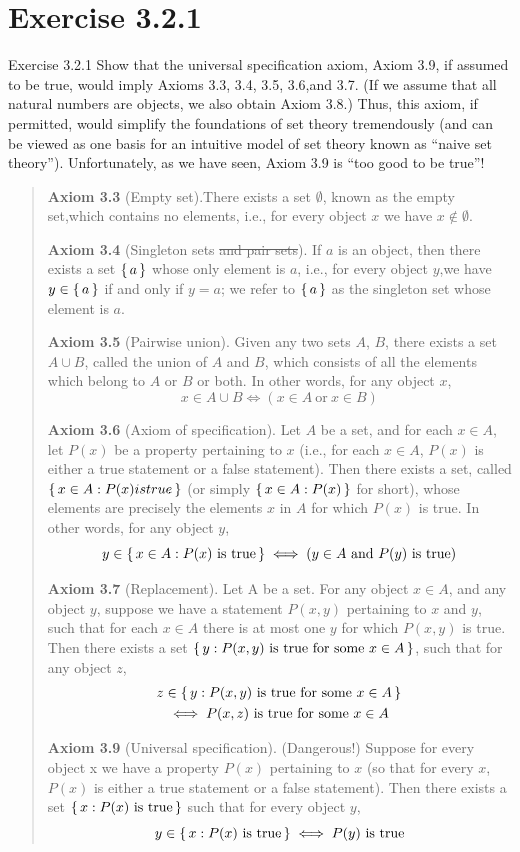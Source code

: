 \documentclass{article}
\begin{document}
\section{Exercise 3.2.1}
Exercise 3.2.1 Show that the universal specification axiom, Axiom 3.9, if assumed to be true,
would imply Axioms 3.3, 3.4, 3.5, 3.6,and 3.7. (If we assume that all natural numbers are objects,
we also obtain Axiom 3.8.) Thus, this axiom, if permitted, would simplify the foundations of set
theory tremendously (and can be viewed as one basis for an intuitive model of set theory known as
“naive set theory”). Unfortunately, as we have seen, Axiom 3.9 is “too good to be true”!
\begin{quotation}
    \textbf{Axiom 3.3} (Empty set).There exists a set $\emptyset$, known as the empty set,which contains
    no elements, i.e., for every object $x$ we have $x \notin \emptyset$.

    \textbf{Axiom 3.4} (Singleton sets \st{and pair sets}). If $a$ is an object, then there exists a set
    $\set{a}$ whose only element is $a$, i.e., for every object $y$,we have $y \in\set{a}$ if and only if
    $y =a$; we refer to $\set{a}$ as the singleton set whose element is $a$.

    \textbf{Axiom 3.5} (Pairwise union). Given any two sets $A$, $B$, there exists a set $A \cup B$,
    called the union of $A$ and $B$, which consists of all the elements which belong to $A$
    or $B$ or both. In other words, for any object $x$,
    \[x \in A\cup B \iff (x \in A\ \text{or}\ x \in B)\]

    \textbf{Axiom 3.6} (Axiom of specification). Let $A$ be a set, and for each $x \in  A$, let $P(x)$
    be a property pertaining to $x$ (i.e., for each $x \in  A$, $P(x)$ is either a true statement or
    a false statement). Then there exists a set, called $\set{x \in  A : P(x) is true}$ (or simply
    $\set{x \in  A : P(x)}$ for short), whose elements are precisely the elements $x$ in $A$ for
    which $P(x)$ is true. In other words, for any object $y$,
    \[y \in
        \set{x \in  A: P(x)\ \text{is true}}
        \iff(y \in  A\ \text{and}\ P(y)\ \text{is true})\]

    \textbf{Axiom 3.7} (Replacement). Let A be a set. For any object $x\in A$, and any object
    $y$, suppose we have a statement $P(x, y)$ pertaining to $x$ and $y$, such that for each
    $x\in A$ there is at most one $y$ for which $P(x,y)$ is true. Then there exists a set
    $\set{y : P(x, y)\text{ is true for some } x\in A}$, such that for any object $z$,
    \begin{gather*}
        z \in\set{y : P(x, y)\text{ is true for some }x\in A}\\
        \iff P(x,z)\text{ is true for some }x\in A
    \end{gather*}

    \textbf{Axiom 3.9} (Universal specification). (Dangerous!) Suppose for every object x we
    have a property $P(x)$ pertaining to $x$ (so that for every $x$, $P(x)$ is either a true
    statement or a false statement). Then there exists a set $\set{x : P(x)\ \text{is true}}$ such that
    for every object $y$,
    \[y \in\set{x : P(x)\ \text{is true}}\iff P(y)\ \text{is true}\]
\end{quotation}
\end{document}
